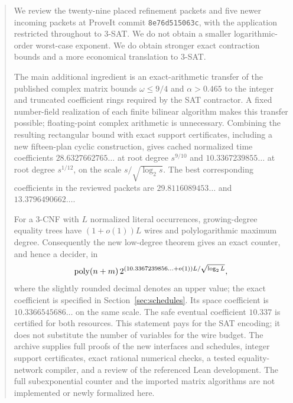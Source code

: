 \begin{abstract}
We review the twenty-nine placed refinement packets and five newer incoming
packets at ProveIt commit \texttt{8e76d515063c}, with the application restricted
throughout to 3-SAT. We do not obtain a smaller logarithmic-order worst-case
exponent. We do obtain stronger exact contraction bounds and a more economical
translation to 3-SAT.

The main additional ingredient is an exact-arithmetic transfer of the published
complex matrix bounds $\omega\le9/4$ and $\alpha>0.465$ to the integer and
truncated coefficient rings required by the SAT contractor. A fixed number-field
realization of each finite bilinear algorithm makes this transfer possible;
floating-point complex arithmetic is unnecessary. Combining the resulting
rectangular bound with exact support certificates, including a new fifteen-plan
cyclic construction, gives cached normalized time coefficients
$28.6327662765\ldots$ at root degree $s^{9/10}$ and
$10.3367239855\ldots$ at root degree $s^{1/12}$, on the scale
$s/\sqrt{\log_2s}$. The best corresponding coefficients in the reviewed
packets are $29.8116089453\ldots$ and $13.3796490662\ldots$.

For a 3-CNF with $L$ normalized literal occurrences, growing-degree equality
trees have $(1+o(1))L$ wires and polylogarithmic maximum degree. Consequently
the new low-degree theorem gives an exact counter, and hence a decider, in
\[
 \poly(n+m)\,2^{(10.3367239856\ldots+o(1))L/\sqrt{\log_2L}},
\]
where the slightly rounded decimal denotes an upper value; the exact
coefficient is specified in Section~\ref{sec:schedules}. Its space coefficient
is $10.3366545686\ldots$ on the same scale. The safe eventual coefficient
$10.337$ is certified for both resources. This statement pays for the SAT
encoding; it does not substitute the number of variables for the wire budget.
The archive supplies full proofs of the new interfaces and schedules,
integer support certificates, exact rational numerical checks, a tested
equality-network compiler, and a review of the referenced Lean development.
The full subexponential counter and the imported matrix algorithms are not
implemented or newly formalized here.
\end{abstract}


